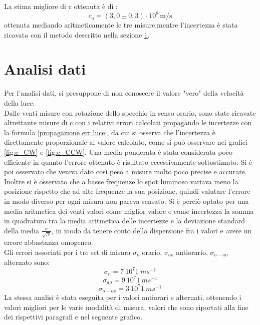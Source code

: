 \documentclass{article}
\begin{document}
            La stima migliore di c ottenuta è di : \[c_{o} = (3,0 \pm 0,3) \cdot 10^8 \, \mathrm{m/s}\] 
            ottenuta mediando aritmeticamente le tre misure,mentre l'incertezza è stata ricavata con il metodo descritto nella sezione \ref{Section:Analisi dati}.
            

    \section{Analisi dati}\label{Section:Analisi dati}
    
        Per l'analisi dati, si presuppone di non conoscere il valore "vero" della velocità della luce. \\
        Dalle venti misure con rotazione dello specchio in senso orario, sono state ricavate altrettante misure di c con i relativi errori calcolati propagando le incertezze 
        con la formula \ref{propagazione err luce}, da cui si osserva che l'incertezza è direttamente proporzionale al valore calcolato, 
        come si può osservare nei grafici \ref{fig:c_CW} e \ref{fig:c_CCW}. 
        Una media ponderata è stata considerata poco efficiente in quanto l'errore ottenuto è risultato eccessivamente sottostimato. 
        Si è poi osservato che veniva dato così peso a misure molto poco precise e accurate. Inoltre si è osservato che a basse frequenze 
        lo spot luminoso variava meno la posizione rispetto che ad alte frequenze la sua posizione, quindi valutare l'errore in modo diverso per ogni misura non pareva sensato.
        Si è perciò optato per una media aritmetica dei venti valori come miglior valore e come incertezza la somma in quadratura tra 
        la media aritmetica delle incertezze e la deviazione standard della media $\frac{\sigma}{\sqrt{N}}$, 
        in modo da tenere conto della dispersione fra i valori e avere un errore abbastanza omogeneo. \\
        Gli errori associati per i tre set di misura $\sigma_{o}$ orario, $\sigma_{ao}$ antiorario, $\sigma_{o-ao}$ alternato sono:
        \[\sigma_{o} = 7\ 10^{7}1\ ms^{-1}\]
        \[\sigma_{ao} = 9\ 10^{7}1\ ms^{-1}\]
        \[\sigma_{o-ao} = 3\ 10^{7}1\ ms^{-1}\]
        La stessa analisi è stata eseguita per i valori antiorari e alternati, ottenendo i valori migliori per le varie modalità di misura, 
        valori che sono riportati alla fine dei rispettivi paragrafi e nel seguente grafico. 
        
\end{document}
